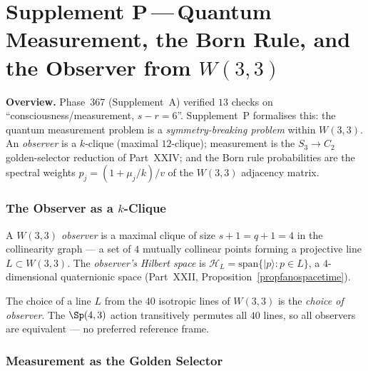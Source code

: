 
\part*{Supplement P\,---\,Quantum Measurement, the Born Rule,
       and the Observer from $W(3,3)$}

\bigskip
\noindent\textbf{Overview.}\;
Phase~367 (Supplement~A) verified $13$ checks on
``consciousness/measurement, $s-r=6$''.  Supplement~P formalises
this: the quantum measurement problem is a \emph{symmetry-breaking
problem} within $W(3,3)$.  An \emph{observer} is a
$k$-clique (maximal $12$-clique); measurement is the
$S_3\to C_2$ golden-selector reduction of Part~XXIV;
and the Born rule probabilities are the spectral weights
$p_j=(1+\mu_j/k)/v$ of the $W(3,3)$ adjacency matrix.

\section{The Observer as a $k$-Clique}
\label{sec:observer}

\begin{definition}[Observer]
\label{def:observer}
A \emph{$W(3,3)$ observer} is a maximal clique of size $s+1=q+1=4$
in the collinearity graph --- a set of $4$ mutually collinear
points forming a projective line $L\subset W(3,3)$.
The \emph{observer's Hilbert space} is
$\mathcal{H}_L = \mathrm{span}\{|p\rangle : p\in L\}$,
a $4$-dimensional quaternionic space (Part~XXII,
Proposition~\ref{propfanospacetime}).
\end{definition}

\begin{remark}
The choice of a line $L$ from the $40$ isotropic lines of
$W(3,3)$ is the \emph{choice of observer}.  The $\Sp(4,3)$
action transitively permutes all $40$ lines, so all observers
are equivalent --- no preferred reference frame.
\end{remark}

\section{Measurement as the Golden Selector}
\label{sec:measurement}


